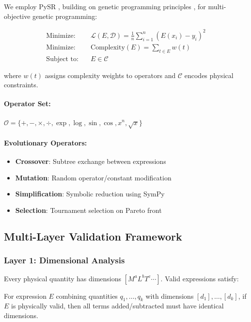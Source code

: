 \documentclass[twoside,11pt]{article}
\begin{document}
We employ PySR \citep{cranmer2023interpretable}, building on genetic programming principles \citep{koza1992genetic,fortin2012deap}, for multi-objective genetic programming:

\begin{align}
\text{Minimize:} \quad & \mathcal{L}(E, \mathcal{D}) = \frac{1}{n}\sum_{i=1}^n (E(x_i) - y_i)^2 \label{eq:loss}\\
\text{Minimize:} \quad & \text{Complexity}(E) = \sum_{t \in E} w(t) \label{eq:complexity}\\
\text{Subject to:} \quad & E \in \mathcal{C} \label{eq:constraints}
\end{align}

where $w(t)$ assigns complexity weights to operators and $\mathcal{C}$ encodes physical constraints.

\paragraph{Operator Set:} $\mathcal{O} = \{+, -, \times, \div, \exp, \log, \sin, \cos, x^n, \sqrt{x}\}$

\paragraph{Evolutionary Operators:}
\begin{itemize}
\item \textbf{Crossover}: Subtree exchange between expressions
\item \textbf{Mutation}: Random operator/constant modification
\item \textbf{Simplification}: Symbolic reduction using SymPy
\item \textbf{Selection}: Tournament selection on Pareto front
\end{itemize}

\subsection{Multi-Layer Validation Framework}

\subsubsection{Layer 1: Dimensional Analysis}

Every physical quantity has dimensions $[M^a L^b T^c \cdots]$. Valid expressions satisfy:

\begin{proposition}
\label{prop:dimensional}
For expression $E$ combining quantities $q_1, \ldots, q_k$ with dimensions $[d_1], \ldots, [d_k]$, if $E$ is physically valid, then all terms added/subtracted must have identical dimensions.
\end{proposition}
\end{document}
